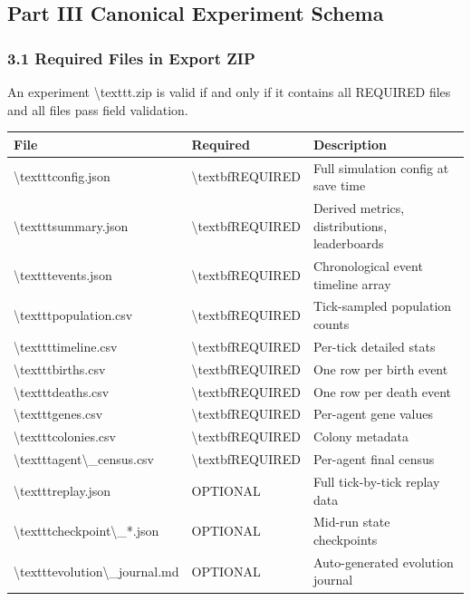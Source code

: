 \documentclass[11pt,a4paper]{article}
\begin{document}
\subsection*{Part III  Canonical Experiment Schema}

\subsubsection*{3.1 Required Files in Export ZIP}

An experiment \textbackslash{}texttt{.zip} is valid if and only if it contains all REQUIRED files and all files pass field validation.

\begin{longtable}{lll}
\toprule
File & Required & Description \\
\midrule
\endhead
\textbackslash{}texttt{config.json} & \textbackslash{}textbf{REQUIRED} & Full simulation config at save time \\
\textbackslash{}texttt{summary.json} & \textbackslash{}textbf{REQUIRED} & Derived metrics, distributions, leaderboards \\
\textbackslash{}texttt{events.json} & \textbackslash{}textbf{REQUIRED} & Chronological event timeline array \\
\textbackslash{}texttt{population.csv} & \textbackslash{}textbf{REQUIRED} & Tick-sampled population counts \\
\textbackslash{}texttt{timeline.csv} & \textbackslash{}textbf{REQUIRED} & Per-tick detailed stats \\
\textbackslash{}texttt{births.csv} & \textbackslash{}textbf{REQUIRED} & One row per birth event \\
\textbackslash{}texttt{deaths.csv} & \textbackslash{}textbf{REQUIRED} & One row per death event \\
\textbackslash{}texttt{genes.csv} & \textbackslash{}textbf{REQUIRED} & Per-agent gene values \\
\textbackslash{}texttt{colonies.csv} & \textbackslash{}textbf{REQUIRED} & Colony metadata \\
\textbackslash{}texttt{agent\textbackslash{}\_census.csv} & \textbackslash{}textbf{REQUIRED} & Per-agent final census \\
\textbackslash{}texttt{replay.json} & OPTIONAL & Full tick-by-tick replay data \\
\textbackslash{}texttt{checkpoint\textbackslash{}\_*.json} & OPTIONAL & Mid-run state checkpoints \\
\textbackslash{}texttt{evolution\textbackslash{}\_journal.md} & OPTIONAL & Auto-generated evolution journal \\

\end{longtable}
\end{document}
